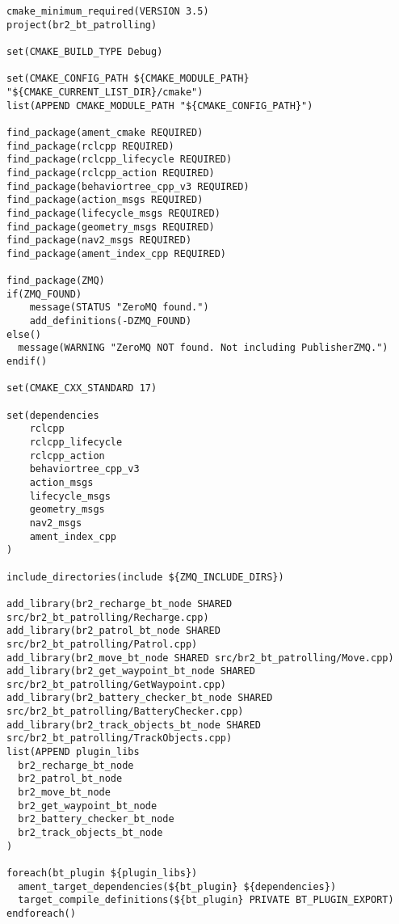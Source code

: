  \footnotesize
\begin{tcolorbox}[sharp corners, colframe=gray!80, colback=LightGray, left=0pt, top=0pt, bottom=0pt, title=\texttt{br2\_bt\_patrolling/CMakeLists.txt}]
  \begin{verbatim}
cmake_minimum_required(VERSION 3.5)
project(br2_bt_patrolling)

set(CMAKE_BUILD_TYPE Debug)

set(CMAKE_CONFIG_PATH ${CMAKE_MODULE_PATH}  "${CMAKE_CURRENT_LIST_DIR}/cmake")
list(APPEND CMAKE_MODULE_PATH "${CMAKE_CONFIG_PATH}")

find_package(ament_cmake REQUIRED)
find_package(rclcpp REQUIRED)
find_package(rclcpp_lifecycle REQUIRED)
find_package(rclcpp_action REQUIRED)
find_package(behaviortree_cpp_v3 REQUIRED)
find_package(action_msgs REQUIRED)
find_package(lifecycle_msgs REQUIRED)
find_package(geometry_msgs REQUIRED)
find_package(nav2_msgs REQUIRED)
find_package(ament_index_cpp REQUIRED)

find_package(ZMQ)
if(ZMQ_FOUND)
    message(STATUS "ZeroMQ found.")
    add_definitions(-DZMQ_FOUND)
else()
  message(WARNING "ZeroMQ NOT found. Not including PublisherZMQ.")
endif()

set(CMAKE_CXX_STANDARD 17)

set(dependencies
    rclcpp
    rclcpp_lifecycle
    rclcpp_action
    behaviortree_cpp_v3
    action_msgs
    lifecycle_msgs
    geometry_msgs
    nav2_msgs
    ament_index_cpp
)

include_directories(include ${ZMQ_INCLUDE_DIRS})

add_library(br2_recharge_bt_node SHARED src/br2_bt_patrolling/Recharge.cpp)
add_library(br2_patrol_bt_node SHARED src/br2_bt_patrolling/Patrol.cpp)
add_library(br2_move_bt_node SHARED src/br2_bt_patrolling/Move.cpp)
add_library(br2_get_waypoint_bt_node SHARED src/br2_bt_patrolling/GetWaypoint.cpp)
add_library(br2_battery_checker_bt_node SHARED src/br2_bt_patrolling/BatteryChecker.cpp)
add_library(br2_track_objects_bt_node SHARED src/br2_bt_patrolling/TrackObjects.cpp)
list(APPEND plugin_libs
  br2_recharge_bt_node
  br2_patrol_bt_node
  br2_move_bt_node
  br2_get_waypoint_bt_node
  br2_battery_checker_bt_node
  br2_track_objects_bt_node
)

foreach(bt_plugin ${plugin_libs})
  ament_target_dependencies(${bt_plugin} ${dependencies})
  target_compile_definitions(${bt_plugin} PRIVATE BT_PLUGIN_EXPORT)
endforeach()


\end{verbatim}
\end{tcolorbox}
